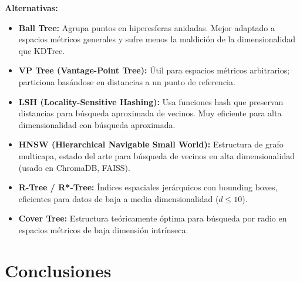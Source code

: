 \documentclass[12pt,a4paper]{article}
\begin{document}
\textbf{Alternativas:}
\begin{itemize}
    \item \textbf{Ball Tree:} Agrupa puntos en hiperesferas anidadas. Mejor adaptado a espacios métricos generales y sufre menos la maldición de la dimensionalidad que KDTree.
    \item \textbf{VP Tree (Vantage-Point Tree):} Útil para espacios métricos arbitrarios; particiona basándose en distancias a un punto de referencia.
    \item \textbf{LSH (Locality-Sensitive Hashing):} Usa funciones hash que preservan distancias para búsqueda aproximada de vecinos. Muy eficiente para alta dimensionalidad con búsqueda aproximada.
    \item \textbf{HNSW (Hierarchical Navigable Small World):} Estructura de grafo multicapa, estado del arte para búsqueda de vecinos en alta dimensionalidad (usado en ChromaDB, FAISS).
    \item \textbf{R-Tree / R*-Tree:} Índices espaciales jerárquicos con bounding boxes, eficientes para datos de baja a media dimensionalidad ($d \leq 10$).
    \item \textbf{Cover Tree:} Estructura teóricamente óptima para búsqueda por radio en espacios métricos de baja dimensión intrínseca.
\end{itemize}

\section{Conclusiones}
\end{document}
